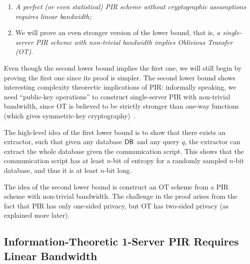 \begin{enumerate}
    \item \textit{A perfect (or even statistical) PIR scheme without cryptographic assumptions requires linear bandwidth;}
    \item We will prove an even stronger version of the lower bound, that is, 
\textit{a single-server PIR scheme with non-trivial bandwidth implies Oblivious Transfer (OT)}.
\end{enumerate}

Even though the second lower bound implies the first one,
we will still begin by proving the first one since its proof is simpler. 
The second lower bound shows interesting 
complexity theorectic implications of PIR: informally speaking,
we need ``public-key operations'' to construct single-server PIR with 
non-trivial bandwidth, since OT is believed to be strictly stronger
than one-way functions (which gives symmetric-key cryptography)~\cite{IR89}.

The high-level idea of the first lower bound is to show that there exists an extractor, such that given any database ${\sf DB}$ and any query $q$, the extractor can extract the whole database given the communication script.
This shows that the communication script has at least $n$-bit of entropy for a  
randomly sampled $n$-bit database, 
and thus it is at least $n$-bit long. 

The idea of the second lower bound is construct an OT  
scheme from a PIR scheme 
with non-trivial bandwidth.
The challenge in the proof arises from the fact that PIR has only one-sided
privacy, but OT has two-sided privacy (as explained more later).







\subsection{Information-Theoretic 1-Server PIR Requires Linear Bandwidth}

